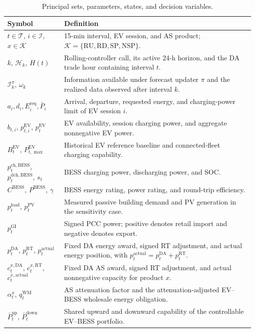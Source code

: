 \documentclass[final,5p,times]{elsarticle}
\newcommand{\EV}{\mathrm{EV}}
\newcommand{\BESS}{\mathrm{BESS}}
\newcommand{\DA}{\mathrm{DA}}
\newcommand{\RT}{\mathrm{RT}}
\newcommand{\GI}{\mathrm{GI}}
\newcommand{\PV}{\mathrm{PV}}
\newcommand{\RU}{\mathrm{RU}}
\newcommand{\RD}{\mathrm{RD}}
\newcommand{\SP}{\mathrm{SP}}
\newcommand{\NSP}{\mathrm{NSP}}
\newcommand{\WM}{\mathrm{WM}}
\newcommand{\ch}{\mathrm{ch}}
\newcommand{\dch}{\mathrm{dch}}
\newcommand{\actual}{\mathrm{actual}}
\newcommand{\req}{\mathrm{req}}
\newcommand{\load}{\mathrm{load}}
\newcommand{\calT}{\mathcal{T}}
\newcommand{\calH}{\mathcal{H}}
\newcommand{\calI}{\mathcal{I}}
\newcommand{\calK}{\mathcal{K}}
\begin{document}
\begin{table}[H]
\centering
\caption{Principal sets, parameters, states, and decision variables.}
\label{tab:nomenclature}
\scriptsize
\begin{tabularx}{\textwidth}{@{}p{}X@{}}
\toprule
Symbol & Definition \\
\midrule
$t\in\calT$, $i\in\calI$, $x\in\calK$ & 15-min interval, EV session, and AS product; $\calK=\{\RU,\RD,\SP,\NSP\}$. \\
$k$, $\calH_k$, $H(t)$ & Rolling-controller call, its active 24-h horizon, and the DA trade hour containing interval $t$. \\
$\mathcal I_k^\pi$, $\omega_k$ & Information available under forecast updater $\pi$ and the realized data observed after interval $k$. \\
$a_i,d_i,E_i^{\req},\bar P_i$ & Arrival, departure, requested energy, and charging-power limit of EV session $i$. \\
$b_{t,i}$, $p_{t,i}^{\EV}$, $p_t^{\EV}$ & EV availability, session charging power, and aggregate nonnegative EV power. \\
$B_t^{\EV}$, $P_{t,\max}^{\EV}$ & Historical EV reference baseline and connected-fleet charging capability. \\
$p_t^{\ch,\BESS}$, $p_t^{\dch,\BESS}$, $s_t$ & BESS charging power, discharging power, and SOC. \\
$C^{\BESS}$, $P^{\BESS}$, $\gamma$ & BESS energy rating, power rating, and round-trip efficiency. \\
$p_t^{\load}$, $p_t^{\PV}$ & Measured passive building demand and PV generation in the sensitivity case. \\
$p_t^{\GI}$ & Signed PCC power; positive denotes retail import and negative denotes export. \\
$p_t^{\DA}$, $p_t^{\RT}$, $p_t^{\actual}$ & Fixed DA energy award, signed RT adjustment, and actual energy position, with $p_t^{\actual}=p_t^{\DA}+p_t^{\RT}$. \\
$c_t^{x,\DA}$, $c_t^{x,\RT}$, $c_t^{x,\actual}$ & Fixed DA AS award, signed RT adjustment, and actual nonnegative capacity for product $x$. \\
$\alpha_t^x$, $q_t^{\WM}$ & AS attenuation factor and the attenuation-adjusted EV--BESS wholesale energy obligation. \\
$\bar P_t^{\mathrm{up}}$, $\bar P_t^{\mathrm{down}}$ & Shared upward and downward capability of the controllable EV--BESS portfolio. \\

\end{tabularx}
\end{table}
\end{document}
